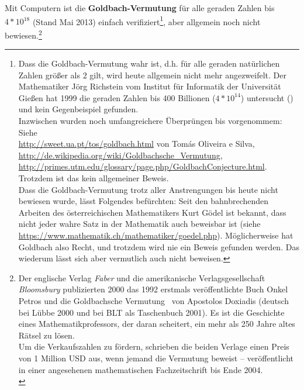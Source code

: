 \begin{refsegment}
\noindent Mit Computern ist die \textbf{Goldbach-Vermutung}
     für alle geraden Zahlen bis $4*10^{18}$ (Stand Mai 2013) einfach
     verifiziert\footnote{%
     Dass die Goldbach-Vermutung wahr ist, d.h. für alle geraden
     natürlichen Zahlen größer als $2$ gilt, wird heute allgemein nicht
     mehr angezweifelt. Der Mathematiker Jörg Richstein
     vom Institut für Informatik der Universität Gießen hat 1999 die geraden
     Zahlen bis 400 Billionen ($4*10^{14}$) untersucht (\cite{Richstein1999})
     und kein Gegenbeispiel gefunden.\\
     Inzwischen wurden noch umfangreichere Überprüngen bis vorgenommem: Siehe\\
     \url{http://sweet.ua.pt/tos/goldbach.html} von Tomás Oliveira e Silva, \\
     \url{http://de.wikipedia.org/wiki/Goldbachsche\_Vermutung},\\
     \url{http://primes.utm.edu/glossary/page.php/GoldbachConjecture.html}.\\
     Trotzdem ist das kein allgemeiner Beweis.\\
     Dass die Goldbach-Vermutung trotz aller Anstrengungen bis heute
     nicht bewiesen wurde, lässt Folgendes befürchten:
     Seit den bahnbrechenden Arbeiten des österreichischen Mathematikers
     Kurt Gödel ist bekannt, dass nicht jeder wahre
     Satz in der Mathematik auch beweisbar ist (siehe
     \url{https://www.mathematik.ch/mathematiker/goedel.php}).
     Möglicherweise hat Goldbach also Recht, und trotzdem wird nie ein
     Beweis gefunden werden. Das wiederum lässt sich aber vermutlich auch
     nicht beweisen.
     },   %
     aber allgemein noch nicht bewiesen.\footnote{%
     Der englische Verlag {\em Faber} und die amerikanische
     Verlagsgesellschaft {\em Bloomsbury} publizierten 2000 das 1992 erstmals
     veröffentlichte Buch \glqq Onkel Petros und die Goldbachsche
     Vermutung\grqq~ von Apostolos Doxiadis (deutsch bei
     Lübbe 2000 und bei BLT als Taschenbuch 2001). Es ist
     die Geschichte eines Mathematikprofessors, der daran scheitert, ein
     mehr als 250 Jahre altes Rätsel zu lösen.\\
     Um die Verkaufszahlen zu fördern, schrieben die beiden Verlage einen
     Preis von 1 Million USD aus, wenn jemand die Vermutung beweist --
     veröffentlicht in einer angesehenen mathematischen Fachzeitschrift
     bis Ende 2004.\\
}
\end{refsegment}

